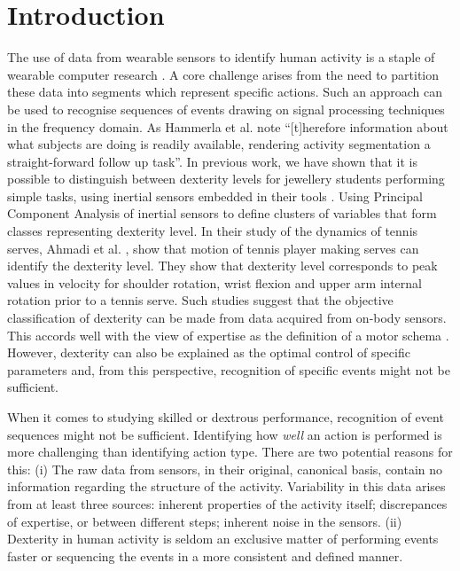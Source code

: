 \documentclass{sigchi}
\begin{document}
\section{Introduction}

The use of data from wearable sensors to identify human activity is a staple of wearable computer research \cite{Bulling2014}. 
A core challenge arises from the need to partition these data into segments which represent specific actions. 
Such an approach can be used to recognise sequences of events drawing on signal processing techniques in the frequency domain.
As Hammerla et al. \cite{Hammerla2011}
note ``[t]herefore information about what subjects are doing is readily available, rendering activity 
segmentation a straight-forward follow up task''. 
In previous work, we have shown that it is possible to distinguish between dexterity levels for jewellery 
students performing simple tasks, using inertial sensors embedded in their tools \cite{RefXXX}.
Using Principal Component Analysis of inertial sensors to define clusters of variables that form classes 
representing dexterity level.
In their study of the dynamics of tennis serves,  Ahmadi et al. \cite{Ahmadi2010}, 
show that motion of tennis player making serves can identify the dexterity level.
They show that dexterity level corresponds to peak values in velocity for shoulder rotation, 
wrist flexion and upper arm internal rotation prior to a tennis serve. Such studies suggest that the objective 
classification of dexterity can be made from data acquired from on-body sensors. 
This accords well with the view of expertise as the definition of a motor schema \cite{Kelso2014}. %
However, dexterity can also be explained as the optimal control of specific parameters and, from this perspective, 
recognition of specific events might not be sufficient. 

When it comes to studying skilled or dextrous performance, recognition of event sequences might not be sufficient. 
Identifying how \textit{well} an action is performed is more challenging than identifying action type.
There are two potential reasons for this:
(i) The raw data from sensors, in their original, canonical basis, contain no information regarding the structure of
the activity. Variability in this data arises from at least three sources:
inherent properties of the activity itself; discrepances of expertise, or between different steps;
inherent noise in the sensors.
(ii) Dexterity in human activity is seldom an exclusive matter of performing events 
faster or sequencing the events in a more consistent and defined manner. 
\end{document}
